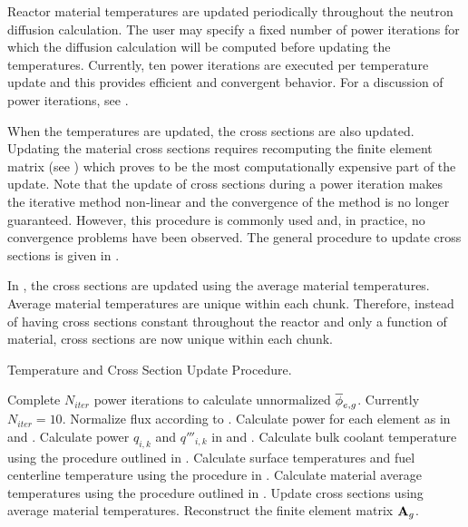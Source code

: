   Reactor material temperatures are updated periodically throughout the neutron
  diffusion calculation. The user may specify a fixed number of power iterations
  for which the diffusion calculation will be computed before updating the
  temperatures. Currently, ten power iterations are executed per temperature
  update and this provides efficient and convergent behavior. For a discussion
  of power iterations, see .
  
  When the temperatures are updated, the cross sections are also updated.
  Updating the material cross sections requires recomputing the finite element
  matrix (see ) which proves to be the most
  computationally expensive part of the update. Note that the update of cross
  sections during a power iteration makes the iterative method non-linear and
  the convergence of the method is no longer guaranteed. However, this procedure
  is commonly used and, in practice, no convergence problems have been observed.
  The general procedure to update cross sections is given in
  .

  In , the cross sections are
  updated using the average material temperatures. Average material
  temperatures are unique within each chunk. Therefore, instead of having
  cross sections constant throughout the reactor and only a function of
  material, cross sections are now unique within each chunk.

  \begin{algorithm}
    \caption{Temperature and Cross Section Update Procedure.}
    \label{algorithm:temperature_update}
    \begin{algorithmic}[1]
      \State Complete $N_{iter}$ power iterations to calculate unnormalized
        ${\overline{\phi}_{e,g}}$. Currently $N_{iter}=10$.
      \State Normalize flux according to .
      \State Calculate power for each element as in  and
        .
        \State Calculate power $q_{i,k}$ and $q'''_{i,k}$ in 
          and .
        \State Calculate bulk coolant temperature using the 
          procedure outlined in .
        \State Calculate surface temperatures and fuel centerline temperature
          using the procedure in .
        \State Calculate material average temperatures using the procedure 
          outlined in .
        \State Update cross sections using average material temperatures.
      \EndFor
      \State Reconstruct the finite element matrix $\mathbf{A}_g$.
    \end{algorithmic}
  \end{algorithm}

